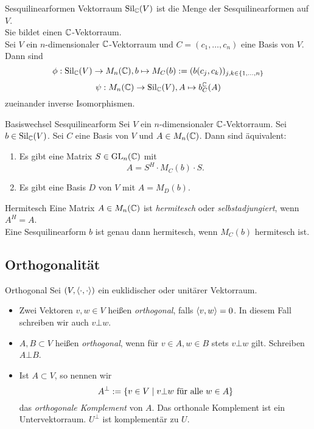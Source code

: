 \documentclass[main.tex]{subfiles}
\begin{document}
\begin{karte}{Sesquilinearformen Vektorraum}
    \( \operatorname{Sil}_{\mathbb{C}}(V) \) ist die Menge der 
    Sesquilinearformen auf \( V \). \\
    Sie bildet einen \( \mathbb{C} \)-Vektorraum.\\
    Sei \( V \) ein \(n\)-dimensionaler \(\mathbb{C}\)-Vektorraum 
    und \( C=(c_1, \ldots, c_n) \) eine Basis von \(V\).
    Dann sind  
    \[ \phi : \operatorname{Sil}_{\mathbb{C}}(V) \rightarrow M_n(\mathbb{C}), 
    b\mapsto M_C(b) := (b(c_j, c_k))_{j,k\in\{1,\ldots,n\}} \]
    \[ \psi : M_n(\mathbb{C}) \rightarrow \operatorname{Sil}_{\mathbb{C}}(V), A \mapsto b^{\mathbb{C}}_C(A) \]
    zueinander inverse Isomorphismen.
\end{karte}

\begin{karte}{Basiswechsel Sesquilinearform}
    Sei \(V\) ein \(n\)-dimensionaler \(\mathbb{C}\)-Vektorraum. 
    Sei \(b \in \operatorname{Sil}_{\mathbb{C}}(V)\). Sei \(C\) eine Basis von 
    \(V\) und \(A\in M_n(\mathbb{C})\). Dann sind äquivalent:
    \begin{enumerate}
        \item Es gibt eine Matrix \( S \in \operatorname{GL}_n(\mathbb{C}) \) mit 
        \[ A=S^H \cdot M_C(b) \cdot S. \]
        \item Es gibt eine Basis \(D\) von \( V \) 
        mit \( A=M_D(b) \).
    \end{enumerate}
\end{karte}

\begin{karte}{Hermitesch}
    Eine Matrix \(A\in M_n(\mathbb{C})\) ist \textit{hermitesch} 
    oder \textit{selbstadjungiert}, wenn \(A^H=A\).\\
    Eine Sesquilinearform \( b \) ist genau dann 
    hermitesch, wenn \(M_C(b)\) hermitesch ist.
\end{karte}

\subsection*{Orthogonalität}

\begin{karte}{Orthogonal}
    Sei \( (V, \langle \cdot, \cdot \rangle) \) ein 
    euklidischer oder unitärer Vektorraum. 
    \begin{itemize}
        \item Zwei Vektoren \(v,w\in V\) heißen 
        \textit{orthogonal}, falls 
        \( \langle v, w \rangle = 0 \). In diesem Fall 
        schreiben wir auch \(v\bot w\).
        \item \( A, B \subset V \) heißen \textit{orthogonal}, 
        wenn für \( v\in A, w\in B \) stets \(v\bot w\) gilt.
        Schreiben \(A\bot B\).
        \item Ist \( A\subset V \), so nennen wir 
        \[ A^\bot := \{ v\in V \;\vert\; v\bot w \text{ für alle } w\in A \} \]
        das \textit{orthogonale Komplement} von \(A\). Das orthonale 
        Komplement ist ein Untervektorraum. \( U^\bot \) ist 
        komplementär zu \(U\).
    \end{itemize}
\end{karte}
\end{document}

